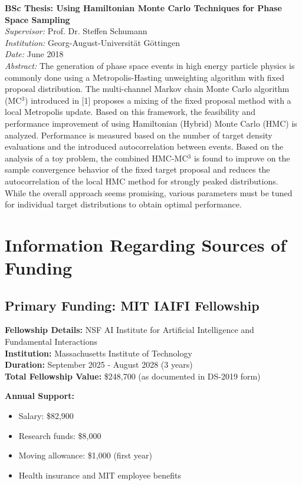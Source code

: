 \documentclass[11pt]{article}
\newcommand{\currentsection}{}
\newcommand{\sectionwithheader}[1]{
    \section{#1}
    \renewcommand{\currentsection}{\thesection. #1}
}
\begin{document}
\textbf{BSc Thesis: Using Hamiltonian Monte Carlo Techniques for Phase Space Sampling}\\
\textit{Supervisor:} Prof. Dr. Steffen Schumann\\
\textit{Institution:} Georg-August-Universität Göttingen\\
\textit{Date:} June 2018\\
\textit{Abstract:} The generation of phase space events in high energy particle physics is commonly done using a Metropolis-Hasting unweighting algorithm with fixed proposal distribution. The multi-channel Markov chain Monte Carlo algorithm (MC$^3$) introduced in [1] proposes a mixing of the fixed proposal method with a local Metropolis update. Based on this framework, the feasibility and performance improvement of using Hamiltonian (Hybrid) Monte Carlo (HMC) is analyzed. Performance is measured based on the number of target density evaluations and the introduced autocorrelation between events. Based on the analysis of a toy problem, the combined HMC-MC$^3$ is found to improve on the sample convergence behavior of the fixed target proposal and reduces the autocorrelation of the local HMC method for strongly peaked distributions. While the overall approach seems promising, various parameters must be tuned for individual target distributions to obtain optimal performance.

\newpage

\sectionwithheader{Information Regarding Sources of Funding}

\subsection*{Primary Funding: MIT IAIFI Fellowship}

\textbf{Fellowship Details:} NSF AI Institute for Artificial Intelligence and Fundamental Interactions\\
\textbf{Institution:} Massachusetts Institute of Technology\\
\textbf{Duration:} September 2025 - August 2028 (3 years)\\
\textbf{Total Fellowship Value:} \$248,700 (as documented in DS-2019 form)

\textbf{Annual Support:}
\begin{itemize}[noitemsep]
\item Salary: \$82,900
\item Research funds: \$8,000
\item Moving allowance: \$1,000 (first year)
\item Health insurance and MIT employee benefits
\end{itemize}
\end{document}
